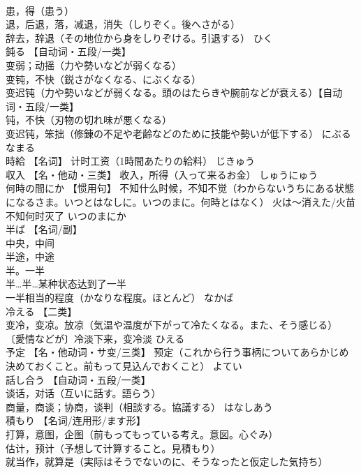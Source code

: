 \documentclass[8pt]{extreport}
\begin{document}
\begin{CJK}{UTF8}{min}
\\	患，得（患う） 
\\	退，后退，落，减退，消失（しりぞく。後へさがる） 
\\	辞去，辞退（その地位から身をしりぞける。引退する）	ひく	
\\	鈍る	【自动词・五段/一类】 
\\	变弱；动摇（力や勢いなどが弱くなる） 
\\	变钝，不快（鋭さがなくなる、にぶくなる） 
\\	变迟钝（力や勢いなどが弱くなる。頭のはたらきや腕前などが衰える）【自动词・五段/一类】 
\\	钝，不快（刃物の切れ味が悪くなる） 
\\	变迟钝，笨拙（修錬の不足や老齢などのために技能や勢いが低下する）	にぶる なまる	
\\	時給	【名词】 计时工资（1時間あたりの給料）	じきゅう	
\\	収入	【名・他动・三类】 收入，所得（入って来るお金）	しゅうにゅう	
\\	何時の間にか	【惯用句】 不知什么时候，不知不觉（わからないうちにある状態になるさま。いつとはなしに。いつのまに。何時とはなく） 火は～消えた/火苗不知何时灭了	いつのまにか	
\\	半ば	【名词/副】 
\\	中央，中间 
\\	半途，中途 
\\	半。一半 
\\	半…半…某种状态达到了一半 
\\	一半相当的程度（かなりな程度。ほとんど）	なかば	
\\	冷える	【二类】 
\\	变冷，变凉。放凉（気温や温度が下がって冷たくなる。また、そう感じる） 
\\	〔愛情などが〕冷淡下来，变冷淡	ひえる	
\\	予定	【名・他动词・サ变/三类】 预定（これから行う事柄についてあらかじめ決めておくこと。前もって見込んでおくこと）	よてい	
\\	話し合う	【自动词・五段/一类】 
\\	谈话，对话（互いに話す。語らう） 
\\	商量，商谈；协商，谈判（相談する。協議する）	はなしあう	
\\	積もり	【名词/连用形/ます形】 
\\	打算，意图，企图（前もってもっている考え。意図。心ぐみ） 
\\	估计，预计（予想して计算すること。見積もり） 
\\	就当作，就算是（実际はそうでないのに、そうなったと仮定した気持ち） 

\end{CJK}
\end{document}
